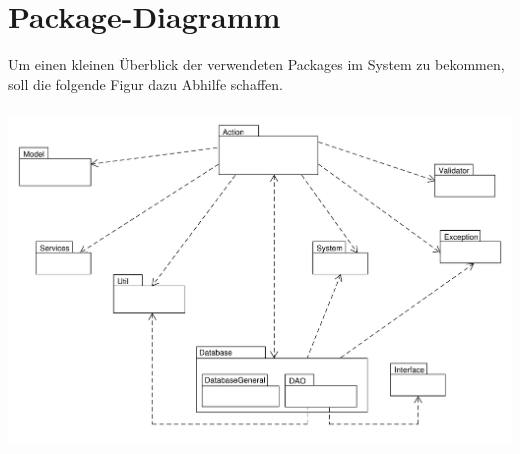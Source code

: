 \section{Package-Diagramm}
 Um einen kleinen Überblick der verwendeten Packages im System zu bekommen, soll die folgende Figur dazu Abhilfe schaffen. \\ \\
\includegraphics[scale=0.45]{Grafiken/PackageDiagramm.pdf}      
    
